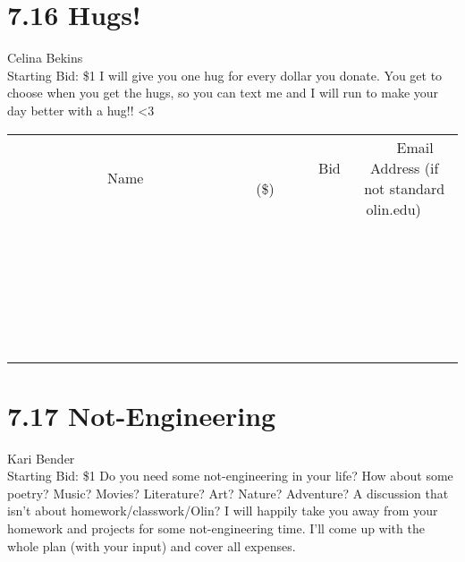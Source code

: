 \documentclass[11pt]{article}
\begin{document}
\section*{7.16 Hugs!}
Celina Bekins
\\
Starting Bid: \$1
\newline
I will give you one hug for every dollar you donate. You get to choose when you get the hugs, so you can text me and I will run to make your day better with a hug!! <3
\\[6ex]
\begin{tabular}{c c c}
~~~~~~~~~~~~~Name~~~~~~~~~~~~~ & ~~~~~~~~~Bid (\$)~~~~~~~~~  & ~~~Email Address (if not standard olin.edu)~~~\\
 & & \\
\hline
 & & \\
\hline
 & & \\
\hline
 & & \\
\hline
 & & \\
\hline
 & & \\
\hline
 & & \\
\hline
 & & \\
\hline
 & & \\
\hline
 & & \\
\hline
 & & \\
\hline
 & & \\
\hline
 & & \\
\hline
 & & \\
\hline
 & & \\
\hline
 & & \\
\hline
 & & \\
\hline
 & & \\
\hline
 & & \\
\hline
 & & \\
\hline
 & & \\
\hline
 & & \\
\hline
 & & \\
\hline
 & & \\
\hline
 & & \\
\hline
 & & \\
\hline
\end{tabular}
\newpage
\section*{7.17 Not-Engineering}
Kari Bender
\\
Starting Bid: \$1
\newline
Do you need some not-engineering in your life?
How about some poetry? Music? Movies? Literature? Art? Nature? Adventure? A discussion that isn't about homework/classwork/Olin?
I will happily take you away from your homework and projects for some not-engineering time. I'll come up with the whole plan (with your input) and cover all expenses.
\end{document}
